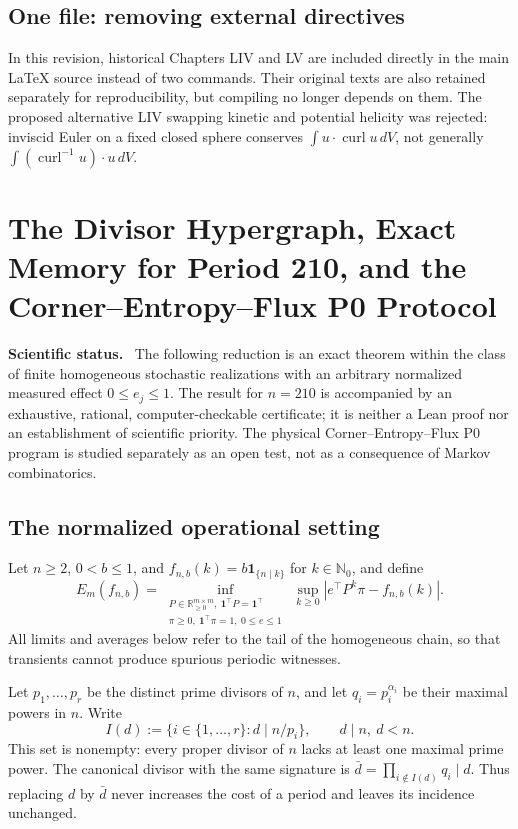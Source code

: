 \documentclass[11pt,a4paper,oneside]{book}
\newcommand{\R}{\mathbb R}\newcommand{\C}{\mathbb C}\newcommand{\Z}{\mathbb Z}\newcommand{\N}{\mathbb N}\newcommand{\Q}{\mathbb Q}
\newcommand{\one}{\mathbf 1}\newcommand{\ii}{\mathrm i}\newcommand{\dd}{\mathrm d}
\newcommand{\note}[1]{\par\medskip\noindent\textbf{#1}\ }
\begin{document}
\section{One file: removing external directives}
In this revision, historical Chapters LIV and LV are included directly in the main \LaTeX{} source instead of two \verb|| commands. Their original texts are also retained separately for reproducibility, but compiling  no longer depends on them. The proposed alternative LIV swapping kinetic and potential helicity was rejected: inviscid Euler on a fixed closed sphere conserves $\int u\cdot\operatorname{curl}u\,dV$, not generally $\int(\operatorname{curl}^{-1}u)\cdot u\,dV$.
\setcounter{equation}{389}


\chapter{The Divisor Hypergraph, Exact Memory for Period 210, and the Corner--Entropy--Flux P0 Protocol}
\note{Scientific status.} The following reduction is an exact theorem within the class of finite homogeneous stochastic realizations with an arbitrary normalized measured effect $0\le e_j\le1$. The result for $n=210$ is accompanied by an exhaustive, rational, computer-checkable certificate; it is neither a Lean proof nor an establishment of scientific priority. The physical Corner--Entropy--Flux P0 program is studied separately as an open test, not as a consequence of Markov combinatorics.
\section{The normalized operational setting}
Let $n\ge2$, $0<b\le1$, and $f_{n,b}(k)=b\one_{\{n\mid k\}}$ for $k\in\N_0$, and define
\begin{equation}
E_m(f_{n,b})=\inf_{\substack{P\in\R_{\ge0}^{m\times m},\ \one^\top P=\one^\top\\\pi\ge0,\ \one^\top\pi=1,\ 0\le e\le1}}\ \sup_{k\ge0}|e^\top P^k\pi-f_{n,b}(k)|.\tag{390}
\end{equation}
All limits and averages below refer to the tail of the homogeneous chain, so that transients cannot produce spurious periodic witnesses.

Let $p_1,\ldots,p_r$ be the distinct prime divisors of $n$, and let $q_i=p_i^{\alpha_i}$ be their maximal powers in $n$. Write
\begin{equation}
I(d):=\{i\in\{1,\ldots,r\}:d\mid n/p_i\},\qquad d\mid n,\ d<n.\tag{391}
\end{equation}
This set is nonempty: every proper divisor of $n$ lacks at least one maximal prime power. The canonical divisor with the same signature is $\bar d=\prod_{i\notin I(d)}q_i\mid d$. Thus replacing $d$ by $\bar d$ never increases the cost of a period and leaves its incidence unchanged.
\end{document}
